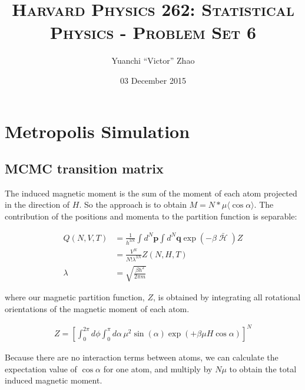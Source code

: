 \documentclass[11pt, letterpaper]{scrartcl} %
\title{	
\normalfont \normalsize 
\textsc{Harvard Physics 262: Statistical Physics - Problem Set 6} \\ [20pt] %
}
\author{Yuanchi ``Victor'' Zhao} %
\date{\normalsize 03 December 2015} %
\numberwithin{equation}{section} %
\numberwithin{figure}{section} %
\numberwithin{table}{section} %
\renewcommand\vec{\mathbf}      %
\DeclareMathOperator{\Haml}{\mathcal{H}}
\begin{document}
\maketitle %

\section{Metropolis Simulation}

\subsection{MCMC transition matrix}

The induced magnetic moment is the sum of the moment of each atom
projected in the direction of $H$. So the approach is to obtain $M =
N*\mu \langle \cos \alpha \rangle$. The contribution of the positions
and momenta to the partition function is separable:

\begin{align}
  Q(N,V,T) &= \frac{1}{h^{3N}} \int d^N\vec{p} \int d^N\vec{q} \exp(-\beta \bar{\Haml}) Z \\
  &= \frac{V^N}{N! \lambda^{3N}} Z(N,H,T)\\
  \lambda &= \sqrt{ \frac{\beta h^2}{2\pi m} }
\end{align}

where our magnetic partition function, $Z$, is obtained by integrating
all rotational orientations of the magnetic moment of each atom.

\begin{align}
  Z = \left[ \int_0^{2\pi} d\phi \int_0^\pi d\alpha \, \mu^2 \sin (\alpha) \exp( +\beta\mu H \cos \alpha) \right]^N
\end{align}

Because there are no interaction terms between atoms, we can calculate
the expectation value of $\cos \alpha$ for one atom, and multiply by
$N\mu$ to obtain the total induced magnetic moment.
\end{document}

